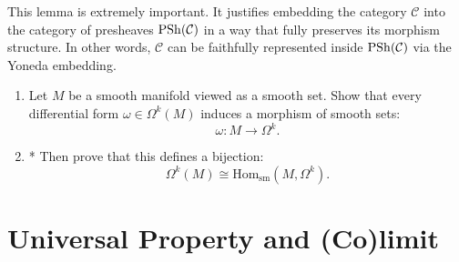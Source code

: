 This lemma is extremely important. It justifies embedding the category $\mathcal{C}$ into the category of presheaves $\mathrm{PSh}(\mathcal{C})$ in a way that fully preserves its morphism structure. In other words, $\mathcal{C}$ can be faithfully represented inside $\mathrm{PSh}(\mathcal{C})$ via the Yoneda embedding.
\begin{exercise}
  \begin{enumerate}
    \item 
Let $M$ be a smooth manifold viewed as a smooth set. Show that every differential form $\omega \in \Omega^k(M)$ induces a morphism of smooth sets:
\[
\omega: M \to \Omega^k.
\]
\item* Then prove that this defines a bijection:
\[
\Omega^k(M) \cong \mathrm{Hom}_{\mathrm{sm}}(M, \Omega^k).
\]
  \end{enumerate}
\end{exercise}

\section{Universal Property and (Co)limit}

